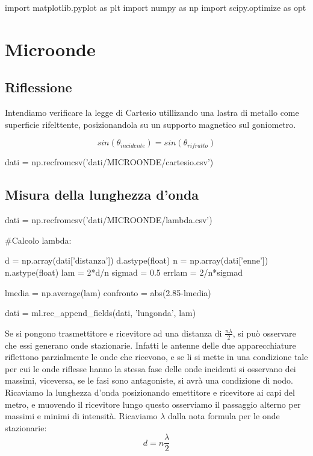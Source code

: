 \begin{sagesilent}
import matplotlib.pyplot as plt
import numpy as np
import scipy.optimize as opt
\end{sagesilent}


\chapter{Microonde}

\section{Riflessione}

Intendiamo verificare la legge di Cartesio utillizando una lastra di metallo come superficie rifelttente, posizionandola su un supporto magnetico sul goniometro.

\begin{equation}
sin(\theta_{incidente}) = sin(\theta_{rifratto})
\end{equation}

\begin{sagesilent}
dati = np.recfromcsv('dati/MICROONDE/cartesio.csv')
\end{sagesilent}

\begin{center}
\end{center}


\section{Misura della lunghezza d'onda}

\begin{sagesilent}
dati = np.recfromcsv('dati/MICROONDE/lambda.csv')

#Calcolo lambda:

d = np.array(dati['distanza'])
d.astype(float)
n = np.array(dati['enne'])
n.astype(float)
lam = 2*d/n
sigmad = 0.5
errlam = 2/n*sigmad

lmedia = np.average(lam)
confronto = abs(2.85-lmedia)

dati = ml.rec_append_fields(dati, 'lungonda', lam)

\end{sagesilent}

Se si pongono trasmettitore e ricevitore ad una distanza di $\frac{n \lambda}{2}$, si può osservare che essi generano onde stazionarie. Infatti le antenne delle due apparecchiature riflettono parzialmente le onde che ricevono, e se li si mette in una condizione tale per cui le onde riflesse hanno la stessa fase delle onde incidenti si osservano dei massimi, viceversa, se le fasi sono antagoniste, si avrà una condizione di nodo.
Ricaviamo la lunghezza d'onda posizionando emettitore e ricevitore ai capi del metro, e muovendo il ricevitore lungo questo osserviamo  il passaggio alterno per massimi e minimi di intensità. Ricaviamo $\lambda$ dalla nota formula per le onde stazionarie:
\begin{equation}
d = n\frac{\lambda}{2}
\label{d}
\end{equation}



